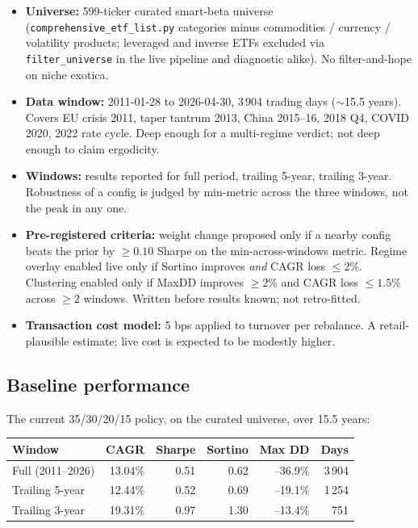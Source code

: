 \documentclass[11pt,a4paper]{article}
\begin{document}
\begin{itemize}[noitemsep]
    \item \textbf{Universe:} 599-ticker curated smart-beta universe (\texttt{comprehensive\_etf\_list.py} categories minus commodities / currency / volatility products; leveraged and inverse ETFs excluded via \texttt{filter\_universe} in the live pipeline and diagnostic alike). No filter-and-hope on niche exotica.
    \item \textbf{Data window:} 2011-01-28 to 2026-04-30, 3\,904 trading days ($\sim$15.5 years). Covers EU crisis 2011, taper tantrum 2013, China 2015--16, 2018 Q4, COVID 2020, 2022 rate cycle. Deep enough for a multi-regime verdict; not deep enough to claim ergodicity.
    \item \textbf{Windows:} results reported for full period, trailing 5-year, trailing 3-year. Robustness of a config is judged by min-metric across the three windows, not the peak in any one.
    \item \textbf{Pre-registered criteria:} weight change proposed only if a nearby config beats the prior by $\geq 0.10$ Sharpe on the min-across-windows metric. Regime overlay enabled live only if Sortino improves \emph{and} CAGR loss $\leq 2$\%. Clustering enabled only if MaxDD improves $\geq 2$\% and CAGR loss $\leq 1.5$\% across $\geq 2$ windows. Written before results known; not retro-fitted.
    \item \textbf{Transaction cost model:} 5 bps applied to turnover per rebalance. A retail-plausible estimate; live cost is expected to be modestly higher.
\end{itemize}

\subsection{Baseline performance}

The current 35/30/20/15 policy, on the curated universe, over 15.5 years:

\begin{table}[H]
\centering
\renewcommand{\arraystretch}{1.3}
\begin{tabular}{lrrrrr}
\toprule
Window & CAGR & Sharpe & Sortino & Max DD & Days \\
\midrule
Full (2011--2026) & 13.04\% & 0.51 & 0.62 & --36.9\% & 3\,904 \\
Trailing 5-year & 12.44\% & 0.52 & 0.69 & --19.1\% & 1\,254 \\
Trailing 3-year & 19.31\% & 0.97 & 1.30 & --13.4\% & 751 \\
\bottomrule
\end{tabular}
\end{table}
\end{document}

